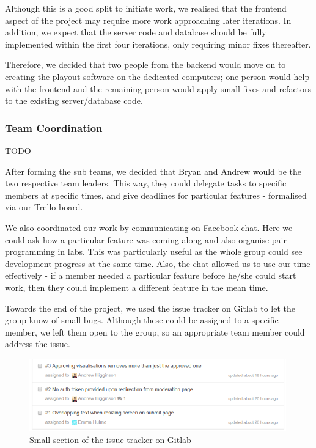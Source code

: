 \documentclass[a4paper, titlepage]{article}
\begin{document}
Although this is a good split to initiate work, we realised that the frontend 
aspect of the project may require more work approaching later iterations.
In addition, we expect that the server code and database should be fully 
implemented within the first four iterations, only requiring minor fixes thereafter.

Therefore, we decided that two people from the backend would move on to creating
the playout software on the dedicated computers; one person would help with the
frontend and the remaining person would apply small fixes and refactors to the
existing server/database code.

\subsubsection{Team Coordination}
TODO

After forming the sub teams, we decided that Bryan and Andrew would be the two respective team 
leaders. This way, they could delegate tasks to specific members at specific times, and give 
deadlines for particular features - formalised via our Trello board.

We also coordinated our work by communicating on Facebook chat. Here we could ask how a particular 
feature was coming along and also organise pair programming in labs. This was particularly useful as 
the whole group could see development progress at the same time. Also, the chat allowed us to use our 
time effectively - if a member needed a particular feature before he/she could start work, then they
could implement a different feature in the mean time. 

Towards the end of the project, we used the issue tracker on Gitlab to let the group know of small bugs.
Although these could be assigned to a specific member, we left them open to the group, so an
appropriate team member could address the issue. 

\begin{figure}[h]
  \centering
    \includegraphics[width = 0.99\textwidth]{./projman/issue_page.png}
  \caption{Small section of the issue tracker on Gitlab}
  \label{fig:projman_issues}
\end{figure}
\end{document}
